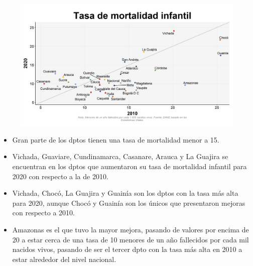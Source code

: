     \begin{figure}[H]
        \caption[Tasa de mortalidad infantil por departamentos - 2010 VS 2020 ]{\label{mortinf_dpto_scatter} }
        \begin{center}
        \includegraphics[width=\textwidth,keepaspectratio]{img/var_290_scatter_time.png}
        \end{center}
    \end{figure}
            \begin{itemize}
                    \item Gran parte de los dptos tienen una tasa de mortalidad menor a 15.
                    \item Vichada, Guaviare, Cundinamarca, Casanare, Arauca y La Guajira se encuentran en los dptos que aumentaron su tasa de mortalidad infantil para 2020 con respecto a la de 2010.
                    \item Vichada, Chocó, La Guajira y Guainía son los dptos con la tasa más alta para 2020, aunque Chocó y Guainía son los únicos que presentaron mejoras con respecto a 2010.
                    \item Amazonas es el que tuvo la mayor mejora, pasando de valores por encima de 20 a estar cerca de una tasa de 10 menores de un año fallecidos por cada mil nacidos vivos, pasando de ser el tercer dpto con la tasa más alta en 2010 a estar alrededor del nivel nacional.
                \end{itemize}

